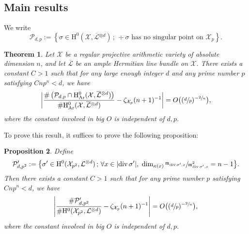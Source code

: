 \documentclass[11pt]{article}
\numberwithin{equation}{section}
\newcommand{\sep}{\,;\,}
\theoremstyle{plain}
\newtheorem{thm}{Theorem}[section]
\newtheorem{prop}[thm]{Proposition}
\theoremstyle{definition}
\newcommand{\ho}{\mathrm{H}}
\newcommand{\m}{\mathfrak{m}}
\newcommand{\X}{\mathcal{X}}
\newcommand{\Li}{\overline{\mathcal{L}}{}}
\newcommand{\li}{\mathcal{L}}
\begin{document}
\subsection{Main results}
We write
\[
\mathcal{P}_{d,p}:=\left\{ \sigma\in \ho^0(\X, \Li^{\otimes d})\sep \div \sigma \text{ has no singular point on } \X_p \right\}.
\]

\begin{thm}\label{fiber}
Let $\X$ be a regular projective arithmetic variety of absolute dimension $n$, and let $\Li$ be an ample Hermitian line bundle on $\X$.
There exists a constant $C>1$ such that for any large enough integer $d$ and any prime number $p$ satisfying $Cnp^n<d$, we have
\[
\biggl| \frac{\#\left(\mathcal{P}_{d,p} \cap \ho^0_{\mathrm{Ar}}(\X, \overline{\mathcal{L}}{}^{\otimes d})\right)}{\#\ho^0_{\mathrm{Ar}}(\X, \overline{\mathcal{L}}{}^{\otimes d})} -\zeta_{\X_p}(n+1)^{-1} \biggr|=O\bigl((\sfrac{d}{p})^{-\sfrac{2}{n}} \bigr),
\]
where the constant involved in big $O$ is independent of $d,p$.
\end{thm}

To prove this result, it suffices to prove the following proposition:

\begin{prop}\label{fib}
Define
\[
\mathcal{P}'_{d,p^2}:=\bigl\{ \sigma'\in \ho^0(\X_{p^2}, \li^{\otimes d})\sep \forall x\in |{\div\sigma'}|,\ \dim_{\kappa(x)}\sfrac{\m_{\div \sigma',x}}{\m^2_{\div \sigma', x}}=n-1 \bigr\}.
\]
Then there exists a constant $C>1$ such that for any prime number $p$ satisfying $Cnp^n<d$, we have
\[
\left| \frac{\#\mathcal{P}'_{d,p^2}}{\#\ho^0(\X_{p^2}, \li^{\otimes d})} -\zeta_{\X_p}(n+1)^{-1} \right|=O\bigl((\sfrac{d}{p})^{-\sfrac{2}{n}} \bigr),
\]
where the constant involved in big $O$ is independent of $d,p$.
\end{prop}
\end{document}
